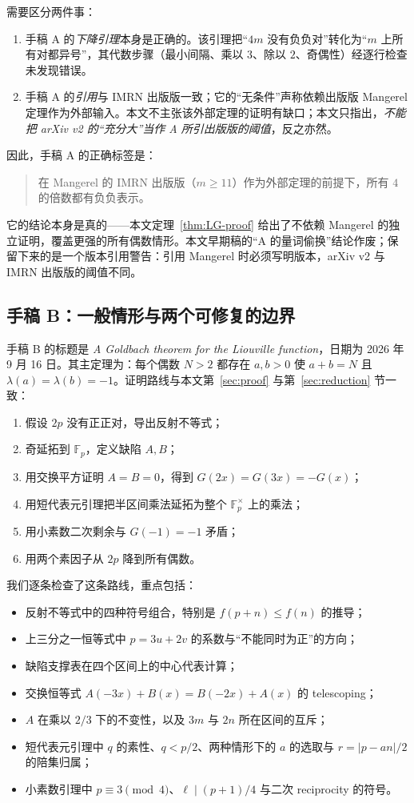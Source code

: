 \documentclass[11pt,a4paper]{ctexart}
\theoremstyle{plain}
\theoremstyle{definition}
\newcommand{\Fp}{\mathbb{F}_p}
\newcommand{\Fpx}{\mathbb{F}_p^{\times}}
\newcommand{\li}{\lambda}
\begin{document}
需要区分两件事：
\begin{enumerate}
\item 手稿 A 的\emph{下降引理}本身是正确的。该引理把“$4m$ 没有负负对”转化为“$m$ 上所有对都异号”，其代数步骤（最小间隔、乘以 $3$、除以 $2$、奇偶性）经逐行检查未发现错误。
\item 手稿 A 的\emph{引用}与 IMRN 出版版一致；它的“无条件”声称依赖出版版 Mangerel 定理作为外部输入。本文不主张该外部定理的证明有缺口；本文只指出，\emph{不能把 arXiv v2 的“充分大”当作 A 所引出版版的阈值}，反之亦然。
\end{enumerate}

因此，手稿 A 的正确标签是：
\begin{quote}
在 Mangerel 的 IMRN 出版版（$m\ge11$）作为外部定理的前提下，所有 $4$ 的倍数都有负负表示。
\end{quote}
它的结论本身是真的——本文定理~\ref{thm:LG-proof} 给出了不依赖 Mangerel 的独立证明，覆盖更强的所有偶数情形。本文早期稿的“A 的量词偷换”结论作废；保留下来的是一个版本引用警告：引用 Mangerel 时必须写明版本，arXiv v2 与 IMRN 出版版的阈值不同。

\subsection{手稿 B：一般情形与两个可修复的边界}
\label{sec:audit-b}

手稿 B 的标题是 \emph{A Goldbach theorem for the Liouville function}，日期为 2026 年 9 月 16 日\cite{captain2026general}。其主定理为：每个偶数 $N>2$ 都存在 $a,b>0$ 使 $a+b=N$ 且 $\li(a)=\li(b)=-1$。证明路线与本文第~\ref{sec:proof} 与第~\ref{sec:reduction} 节一致：
\begin{enumerate}
\item 假设 $2p$ 没有正正对，导出反射不等式；
\item 奇延拓到 $\Fp$，定义缺陷 $A,B$；
\item 用交换平方证明 $A=B=0$，得到 $G(2x)=G(3x)=-G(x)$；
\item 用短代表元引理把半区间乘法延拓为整个 $\Fpx$ 上的乘法；
\item 用小素数二次剩余与 $G(-1)=-1$ 矛盾；
\item 用两个素因子从 $2p$ 降到所有偶数。
\end{enumerate}

我们逐条检查了这条路线，重点包括：
\begin{itemize}
\item 反射不等式中的四种符号组合，特别是 $f(p+n)\le f(n)$ 的推导；
\item 上三分之一恒等式中 $p=3u+2v$ 的系数与“不能同时为正”的方向；
\item 缺陷支撑表在四个区间上的中心代表计算；
\item 交换恒等式 $A(-3x)+B(x)=B(-2x)+A(x)$ 的 telescoping；
\item $A$ 在乘以 $2/3$ 下的不变性，以及 $3m$ 与 $2n$ 所在区间的互斥；
\item 短代表元引理中 $q$ 的素性、$q<p/2$、两种情形下的 $a$ 的选取与 $r=|p-an|/2$ 的陪集归属；
\item 小素数引理中 $p\equiv3\pmod4$、$\ell\mid(p+1)/4$ 与二次 reciprocity 的符号。
\end{itemize}
\end{document}
